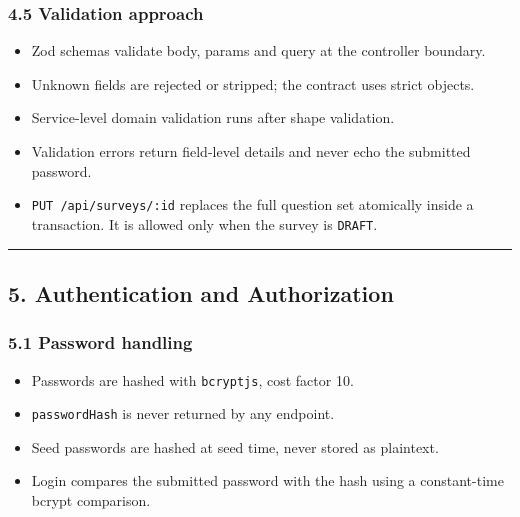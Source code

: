 \documentclass[12pt,a4paper]{article}
\begin{document}
\subsubsection*{4.5 Validation approach}
\begin{itemize}[leftmargin=*]
\item Zod schemas validate body, params and query at the controller boundary.
\item Unknown fields are rejected or stripped; the contract uses strict objects.
\item Service-level domain validation runs after shape validation.
\item Validation errors return field-level details and never echo the submitted password.
\item \texttt{PUT /api/surveys/:id} replaces the full question set atomically inside a transaction. It is allowed only when the survey is \texttt{DRAFT}.
\end{itemize}

\medskip\noindent\rule{\linewidth}{0.4pt}\medskip

\subsection*{5. Authentication and Authorization}
\subsubsection*{5.1 Password handling}
\begin{itemize}[leftmargin=*]
\item Passwords are hashed with \texttt{bcryptjs}, cost factor 10.
\item \texttt{passwordHash} is never returned by any endpoint.
\item Seed passwords are hashed at seed time, never stored as plaintext.
\item Login compares the submitted password with the hash using a constant-time bcrypt comparison.
\end{itemize}

\end{document}
